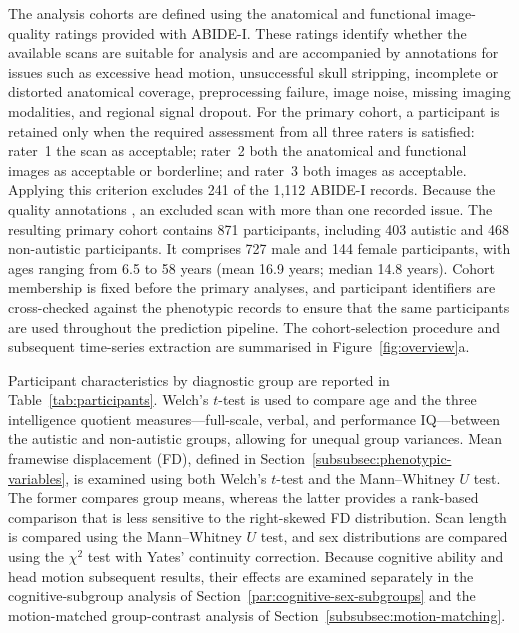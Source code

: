 The analysis cohorts are defined using the anatomical and functional image-quality ratings
provided with ABIDE-I. These ratings identify whether the available scans are suitable for
analysis and are accompanied by annotations for issues such as excessive head motion,
unsuccessful skull stripping, incomplete or distorted anatomical coverage, preprocessing
failure, image noise, missing imaging modalities, and regional signal dropout. For the
primary cohort, a participant is retained only when the required assessment from all three
raters is satisfied: rater~1  the scan as acceptable; rater~2  both the
anatomical and functional images as acceptable or borderline; and rater~3  both
images as acceptable. Applying this criterion excludes 241 of the 1,112 ABIDE-I records.
Because the quality annotations , an excluded scan  with more
than one recorded issue. The resulting primary cohort contains 871 participants, including
403 autistic and 468 non-autistic participants. It comprises 727 male and 144 female
participants, with ages ranging from 6.5 to 58 years (mean 16.9 years; median 14.8 years).
Cohort membership is fixed before the primary analyses, and participant identifiers are
cross-checked against the phenotypic records to ensure that the same participants are used
throughout the prediction pipeline. The cohort-selection procedure and subsequent
time-series extraction are summarised in Figure~\ref{fig:overview}a.

Participant characteristics by diagnostic group are reported in
Table~\ref{tab:participants}. Welch's $t$-test is used to compare age and the three
intelligence quotient measures---full-scale, verbal, and performance IQ---between the
autistic and non-autistic groups, allowing for unequal group variances. Mean framewise
displacement (FD), defined in Section~\ref{subsubsec:phenotypic-variables}, is examined using both Welch's
$t$-test and the Mann--Whitney $U$ test. The former compares group means, whereas the latter
provides a rank-based comparison that is less sensitive to the right-skewed FD
distribution. Scan length is compared using the Mann--Whitney $U$ test, and sex
distributions are compared using the $\chi^2$ test with Yates' continuity correction.
Because cognitive ability and head motion  subsequent results, their effects
are examined separately in the cognitive-subgroup analysis of
Section~\ref{par:cognitive-sex-subgroups} and the motion-matched group-contrast analysis of
Section~\ref{subsubsec:motion-matching}.

